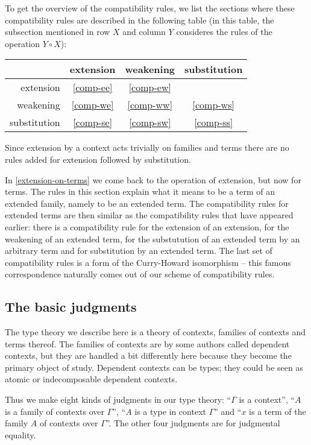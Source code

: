 To get the overview of the compatibility rules, we list the sections
where these compatibility rules are described in the following table (in this
table, the
subsection mentioned in row $X$ and column $Y$ consideres the rules of the
operation $Y\circ X$):
\begin{center}
\begin{tabular}{r|ccc}
& extension & weakening & substitution\\
\hline
extension & \autoref{comp-ee} & \autoref{comp-ew} & \\
weakening & \autoref{comp-we} & \autoref{comp-ww} & \autoref{comp-ws}\\
substitution & \autoref{comp-se} & \autoref{comp-sw} & \autoref{comp-ss}
\end{tabular}
\end{center}
Since extension by a context acts trivially on families and terms there are
no rules added for extension followed by substitution.

In \autoref{extension-on-terms} we come back to the operation of extension, but
now for terms. The rules in this section explain what it means to be a term of
an extended family, namely to be an extended term. The compatibility rules for
extended terms are then similar as the compatibility rules that have appeared
earlier: there is a compatibility rule for the extension of an extension, for
the weakening of an extended term, for the substutution of an extended term by
an arbitrary term and for substitution by an extended term. The last set of
compatibility rules is a form of the Curry-Howard isomorphism -- this famous
correspondence naturally comes out of our scheme of compatibility rules.

\subsection{The basic judgments}
The type theory we describe here is a theory of contexts, families of
contexts and terms thereof. The families of contexts are by some authors called
dependent contexts, but they are handled a bit differently here because they
become the primary object of study. Dependent contexts can be types; they could
be seen as atomic or indecomposable dependent contexts.

Thus we make eight kinds of judgments in our type theory: ``$\Gamma$ is a context'',
``$A$ is a family of contexts over $\Gamma$'', ``$A$ is a type in context $\Gamma$''
and ``$x$ is a term of the family $A$ of contexts over $\Gamma$''. The other four
judgments are for judgmental equality. 


